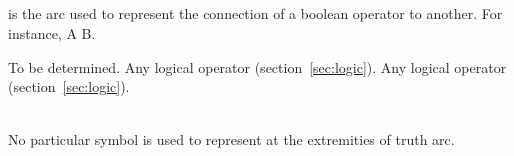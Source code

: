 \subsection{ }\label{sec:truth}

 is the arc used to represent the connection of a boolean operator to another. For instance, A   B.

\begin{description}
 \glyphSboTerm To be determined.
 \glyphOrigin Any logical operator (section~\ref{sec:logic}).
 \glyphTarget Any logical operator (section~\ref{sec:logic}).
 \item[end-points]\mbox{}\\ No particular symbol is used to represent at the extremities of truth arc.
 \end{description}

\begin{center}
\end{center}
\normalcolor
